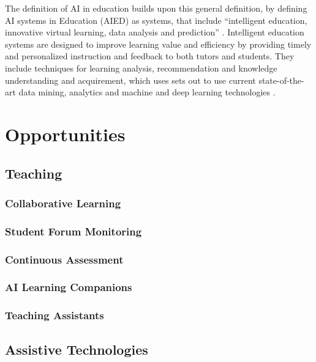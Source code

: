\documentclass{Academic}
\begin{document}
    The definition of AI in education builds upon this general definition, by defining AI systems in Education (AIED) as systems, that include \enquote{intelligent education, innovative virtual learning, data analysis and prediction} \cite{chen_artificial_2020}. Intelligent education systems are designed to improve learning value and efficiency by providing timely and personalized instruction and feedback to both tutors and students. They include techniques for learning analysis, recommendation and knowledge understanding and acquirement, which uses sets out to use current state-of-the-art data mining, analytics and machine and deep learning technologies \cite{chen_artificial_2020}.

    \section{Opportunities}

    \subsection{Teaching}

    \subsubsection{Collaborative Learning}

    \subsubsection{Student Forum Monitoring}

    \subsubsection{Continuous Assessment}

    \subsubsection{AI Learning Companions}

    \subsubsection{Teaching Assistants}

    \subsection{Assistive Technologies}
\end{document}
